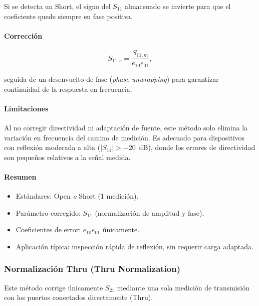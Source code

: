 Si se detecta un Short, el signo del $S_{11}$ almacenado se invierte para que
el coeficiente quede siempre en fase positiva.

\paragraph{Corrección}

\begin{equation}
    S_{11,c} = \frac{S_{11,m}}{e_{10}e_{01}},
    \label{eq:os_norm}
\end{equation}

seguida de un desenvuelto de fase (\emph{phase unwrapping}) para garantizar
continuidad de la respuesta en frecuencia.

\paragraph{Limitaciones}

Al no corregir directividad ni adaptación de fuente, este método solo elimina
la variación en frecuencia del camino de medición. Es adecuado para
dispositivos con reflexión moderada a alta ($|S_{11}| > -20$~dB), donde los
errores de directividad son pequeños relativos a la señal medida.

\paragraph{Resumen}

\begin{itemize}
    \item Estándares: Open \emph{o} Short (1 medición).
    \item Parámetro corregido: $S_{11}$ (normalización de amplitud y fase).
    \item Coeficientes de error: $e_{10}e_{01}$ únicamente.
    \item Aplicación típica: inspección rápida de reflexión, sin requerir carga adaptada.
\end{itemize}

\subsubsection{Normalización Thru (Thru Normalization)}
\label{sec:thru_norm}

Este método corrige únicamente $S_{21}$ mediante una sola medición de
transmisión con los puertos conectados directamente (Thru).

